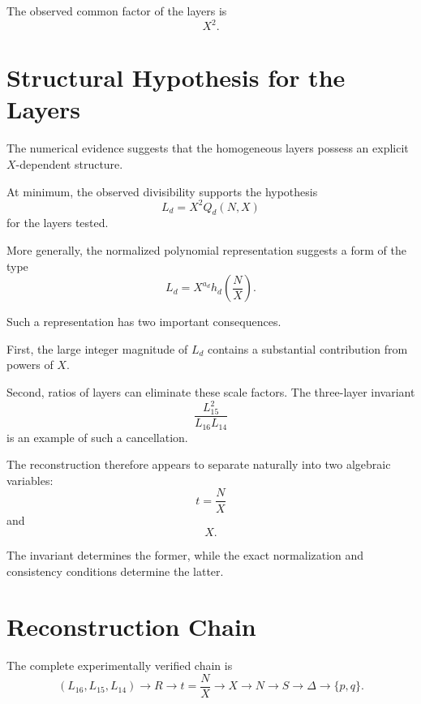 \documentclass[11pt,a4paper]{article}
\theoremstyle{definition}
\theoremstyle{remark}
\begin{document}
The observed common factor of the layers is
\begin{equation}
X^2.
\end{equation}

\section{Structural Hypothesis for the Layers}

The numerical evidence suggests that the homogeneous layers possess an
explicit $X$-dependent structure.

At minimum, the observed divisibility supports the hypothesis
\begin{equation}
L_d=X^2Q_d(N,X)
\end{equation}
for the layers tested.

More generally, the normalized polynomial representation suggests a form
of the type
\begin{equation}
L_d
=
X^{a_d}
h_d\left(\frac{N}{X}\right).
\end{equation}

Such a representation has two important consequences.

First, the large integer magnitude of $L_d$ contains a substantial
contribution from powers of $X$.

Second, ratios of layers can eliminate these scale factors.  The
three-layer invariant
\[
\frac{L_{15}^2}{L_{16}L_{14}}
\]
is an example of such a cancellation.

The reconstruction therefore appears to separate naturally into two
algebraic variables:
\[
t=\frac{N}{X}
\]
and
\[
X.
\]

The invariant determines the former, while the exact normalization and
consistency conditions determine the latter.

\section{Reconstruction Chain}

The complete experimentally verified chain is
\begin{equation}
\boxed{
(L_{16},L_{15},L_{14})
\longrightarrow
R
\longrightarrow
t=\frac{N}{X}
\longrightarrow
X
\longrightarrow
N
\longrightarrow
S
\longrightarrow
\Delta
\longrightarrow
\{p,q\}.
}
\end{equation}
\end{document}
